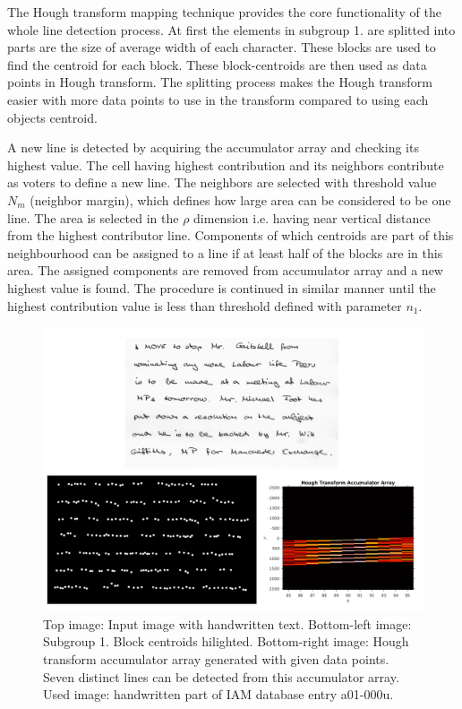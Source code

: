 \documentclass{article}
\begin{document}
            The Hough transform mapping technique provides the core functionality of the whole line detection process. At first the elements in subgroup 1. are splitted into parts are the size of average width of each character. These blocks are used to find the centroid for each block. These block-centroids are then used as data points in Hough transform. The splitting process makes the Hough transform easier with more data points to use in the transform compared to using each objects centroid.

            A new line is detected by acquiring the accumulator array and checking its highest value. The cell having highest contribution and its neighbors contribute as voters to define a new line. The neighbors are selected with threshold value $N_m$ (neighbor margin), which defines how large area can be considered to be one line. The area is selected in the $\rho$ dimension i.e. having near vertical distance from the highest contributor line. Components of which centroids are part of this neighbourhood can be assigned to a line if at least half of the blocks are in this area. The assigned components are removed from accumulator array and a new highest value is found. The procedure is continued in similar manner until the highest contribution value is less than threshold defined with parameter $n_1$.

            \begin{figure}[!ht]
              \centering
              \includegraphics[natwidth=1258, natheight=942,scale=0.38]{text_cents_accarr.png}
              \caption{Top image: Input image with handwritten text. Bottom-left image: Subgroup 1. Block centroids hilighted. Bottom-right image: Hough transform accumulator array generated with given data points. Seven distinct lines can be detected from this accumulator array. Used image: handwritten part of IAM database entry a01-000u. \label{fig:blockandacc} }
            \end{figure}
\end{document}
